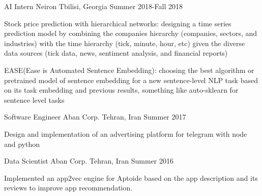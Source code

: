 

\begin{cventries}

 \cventry
    {AI Intern} %
    {Neiron} %
    {Tbilisi, Georgia} %
    {Summer 2018-Fall 2018} %
    {
      \begin{cvitems} %
        \item {Stock price prediction with hierarchical networks: designing a time series prediction model by combining  the companies hierarchy (companies, sectors, and industries) with the time hierarchy (tick, minute, hour, etc) given the diverse data sources (tick data, news, sentiment analysis, and financial reports)}
        \item {EASE(Ease is Automated Sentence Embedding): choosing the best algorithm or pretrained model of sentence embedding for a new sentence-level NLP task based on its task embedding and previous results, something like auto-sklearn for sentence level tasks}
      \end{cvitems}
    }

 \cventry
    {Software Engineer} %
    {Aban Corp.} %
    {Tehran, Iran} %
    {Summer 2017} %
    {
      \begin{cvitems} %
        \item {Design and implementation of an advertising platform for telegram with node and python}
      \end{cvitems}
    }


  \cventry
    {Data Scientist} %
    {Aban Corp.} %
    {Tehran, Iran} %
    {Summer 2016} %
    {
      \begin{cvitems} %
        \item {Implemented an app2vec engine for Aptoide based on the app description and its reviews to improve app recommendation.}
      \end{cvitems}
    }


\end{cventries}
